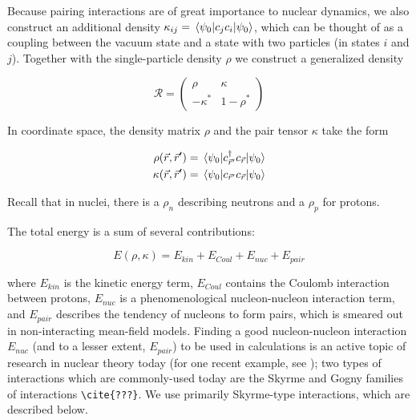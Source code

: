 Because pairing interactions are of great importance to nuclear dynamics, we also construct an additional density $\kappa_{ij} = \expval{c_jc_i}{\psi_0}$, which can be thought of as a coupling between the vacuum state and a state with two particles (in states $i$ and $j$). Together with the single-particle density $\rho$ we construct a generalized density

\begin{equation}
\mathcal{R} = \left(\begin{array}{cc}
\rho & \kappa \\
-\kappa^* & 1-\rho^*
\end{array}\right)
\end{equation}

In coordinate space, the density matrix $\rho$ and the pair tensor $\kappa$ take the form

\begin{align}
\rho(\vec{r},\vec{r}') &= \expval{c_{\vec{r}'}^\dagger c_{\vec{r}}}{\psi_0} \\
\kappa(\vec{r},\vec{r}') &= \expval{c_{\vec{r}'} c_{\vec{r}}}{\psi_0}
\end{align}

\noindent Recall that in nuclei, there is a $\rho_n$ describing neutrons and a $\rho_p$ for protons.

The total energy is a sum of several contributions:

\begin{equation}
E(\rho, \kappa) = E_{kin} + E_{Coul} + E_{nuc} + E_{pair}
\end{equation}

\noindent where $E_{kin}$ is the kinetic energy term, $E_{Coul}$ contains the Coulomb interaction between protons, $E_{nuc}$ is a phenomenological nucleon-nucleon interaction term, and $E_{pair}$ describes the tendency of nucleons to form pairs, which is smeared out in non-interacting mean-field models. Finding a good nucleon-nucleon interaction $E_{nuc}$ (and to a lesser extent, $E_{pair}$) to be used in calculations is an active topic of research in nuclear theory today (for one recent example, see \cite{NavarroPerez2018}); two types of interactions which are commonly-used today are the Skyrme and Gogny families of interactions \verb|\cite{???}|. We use primarily Skyrme-type interactions, which are described below.


